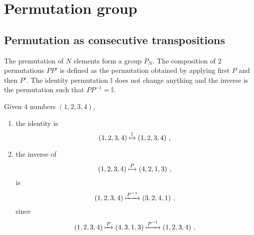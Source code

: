 \chapter{Permutation group}

\section{Permutation as consecutive transpositions}

    The premutation of $N$ elements form a group $P_N$. The composition of $2$ permutations $PP'$ is defined as the permutation obtained by applying first $P$ and then $P'$. The identity permutation $\mathbb I$ does not change anything and the inverse is the permutation such that $P P^{-1} = \mathbb I$. 
    \begin{example}
        Given $4$ numbers $(1,2,3,4)$, 
        \begin{enumerate}
            \item the identity is 
                \begin{equation*}
                    (1,2,3,4) \xmapsto{\mathbb I} (1,2,3,4) ~,
                \end{equation*}
            \item the inverse of  
                \begin{equation*}
                    (1,2,3,4) \xmapsto{P} (4,2,1,3) ~,
                \end{equation*}
                is 
                \begin{equation*}
                    (1,2,3,4) \xmapsto{P^{-1}} (3,2,4,1) ~,
                \end{equation*}
                since 
                \begin{equation*}
                    (1,2,3,4) \xmapsto{P} (4,3,1,3) \xmapsto{P^{-1}} (1,2,3,4) ~,
                \end{equation*}
        \end{enumerate}
    \end{example}
    

